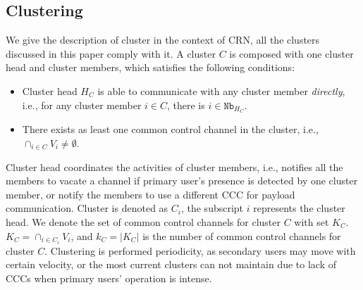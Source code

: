 \documentclass[10pt,journal,compsoc]{IEEEtran}
\theoremstyle{mytheoremstyle}
\theoremstyle{mytheoremstyle}
\theoremstyle{mytheoremstyle}
\newcommand{\ie}{i.e., }
\begin{document}
\subsection{Clustering}
\label{def_cluster}
We give the description of cluster in the context of CRN, all the clusters discussed in this paper comply with it.
A cluster $C$ is composed with one cluster head and cluster members, which satisfies the following conditions:
\begin{itemize}
\item Cluster head $H_C$ is able to communicate with any cluster member \textit{directly}, \ie for any cluster member $i\in C$, there is $i\in \texttt{Nb}_{H_C}$.
\item There exists as least one common control channel in the cluster, \ie $\cap_{i\in C} V_i \neq \emptyset$.
\end{itemize}
Cluster head coordinates the activities of cluster members, \ie notifies all the members to vacate a channel if primary user's presence is detected by one cluster member, or notify the members to use a different CCC for payload communication. 
Cluster is denoted as $C_i$, the subscript $i$ represents the cluster head.
We denote the set of common control channels for cluster $C$ with set $K_C$.
$ K_C = \cap_{i\in C_i} V_i$, and $k_C = |K_C|$ is the number of common control channels for cluster $C$.
Clustering is performed periodicity, as secondary users may move with certain velocity, or the most current clusters can not maintain due to lack of CCCs when primary users' operation is intense.






\end{document}
